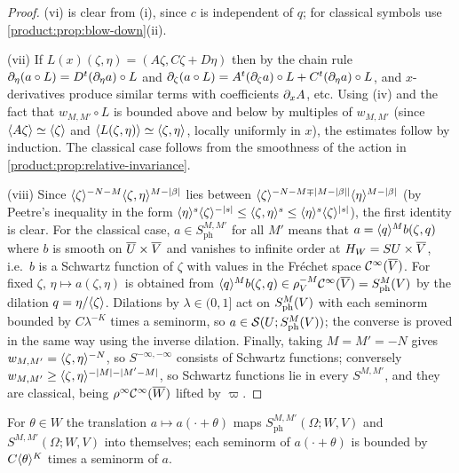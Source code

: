 \begin{proof}
(vi) is clear from (i), since $c$ is independent of $q$; for classical symbols
use \cref{product:prop:blow-down}(ii).

(vii) If $L(x)(\zeta,\eta)=(A\zeta,C\zeta+D\eta)$ then by the chain rule
$\partial_\eta(a\circ L)=D^t(\partial_\eta a)\circ L$ and $\partial_\zeta(a\circ L)=
A^t(\partial_\zeta a)\circ L+C^t(\partial_\eta a)\circ L$, and $x$-derivatives produce
similar terms with coefficients $\partial_xA$, etc. Using (iv) and the fact that
$w_{M,M'}\circ L$ is bounded above and below by multiples of $w_{M,M'}$ (since
$\langle A\zeta\rangle\simeq\langle \zeta\rangle$ and $\langle L(\zeta,\eta)\rangle\simeq\langle \zeta,\eta\rangle$, locally
uniformly in $x$), the estimates follow by induction. The classical case follows
from the smoothness of the action in \cref{product:prop:relative-invariance}.

(viii) Since $\langle \zeta\rangle^{-N-M}\langle \zeta,\eta\rangle^{M-|\beta|}$ lies between
$\langle \zeta\rangle^{-N-M\mp|M-|\beta||}\langle \eta\rangle^{M-|\beta|}$ (by Peetre's inequality in the
form $\langle \eta\rangle^s\langle \zeta\rangle^{-|s|}\le\langle \zeta,\eta\rangle^s\le\langle \eta\rangle^s\langle \zeta\rangle^{|s|}$),
the first identity is clear. For the classical case, $a\in
S^{M,M'}_{\mathrm{ph}}$ for all $M'$ means that $a=\langle q\rangle^Mb(\zeta,q)$ where $b$ is
smooth on $\overline{U}\times\overline{V}$ and vanishes to infinite order at
$H_W=SU\times\overline{V}$, i.e.\ $b$ is a Schwartz function of $\zeta$ with values in
the Fréchet space $\mathcal{C}^\infty(\overline{V})$. For fixed $\zeta$, $\eta\mapsto a(\zeta,\eta)$ is
obtained from $\langle q\rangle^Mb(\zeta,q)\in\rho_V^{-M}\mathcal{C}^\infty(\overline{V})=S^{M}_{\mathrm{ph}}(V)$ by the
dilation $q=\eta/\langle \zeta\rangle$. Dilations by $\lambda\in(0,1]$ act on $S^{M}_{\mathrm{ph}}(V)$
with each seminorm bounded by $C\lambda^{-K}$ times a seminorm, so
$a\in\mathcal{S}(U;S^{M}_{\mathrm{ph}}(V))$; the converse is proved in the same way using the
inverse dilation. Finally, taking $M=M'=-N$ gives $w_{M,M'}=\langle \zeta,\eta\rangle^{-N}$,
so $S^{-\infty,-\infty}$ consists of Schwartz functions; conversely
$w_{M,M'}\ge\langle \zeta,\eta\rangle^{-|M|-|M'-M|}$, so Schwartz functions lie in every
$S^{M,M'}$, and they are classical, being $\rho^\infty\mathcal{C}^\infty(\overline{W})$ lifted by $\varpi$.
\end{proof}

\begin{lemma}[Translations]\label{product:lem:translation}
For $\theta\in W$ the translation $a\longmapsto a(\cdot+\theta)$ maps
$S^{M,M'}_{\mathrm{ph}}(\Omega;W,V)$ and $S^{M,M'}(\Omega;W,V)$ into themselves;
each seminorm of $a(\cdot+\theta)$ is bounded by $C\langle \theta\rangle^K$ times a seminorm
of $a$.
\end{lemma}

